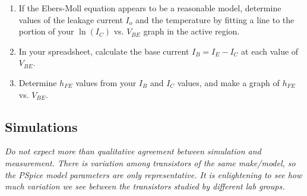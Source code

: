 \documentclass[11pt]{article}
\begin{document}
\begin{enumerate}
\item If the Ebers-Moll equation appears to be a reasonable model,
  determine values of the leakage current $I_o$ and the temperature by
  fitting a line to the portion of your $\ln(I_C)$ vs. $V_{BE}$ graph
  in the active region. 

\item In your spreadsheet, calculate the base current $I_B = I_E -
  I_C$ at each value of $V_{BE}$.
  
\item Determine $h_{FE}$ values from your $I_B$ and $I_C$ values, and
  make a graph of $h_{FE}$ vs. $V_{BE}$.
\end{enumerate}

\subsection*{Simulations}

\emph{Do not expect more than qualitative agreement between simulation
and measurement. There is variation among transistors of the same
make/model, so the PSpice model parameters are only representative. It
is enlightening to see how much variation we see between the transistors
studied by different lab groups.}
\end{document}
